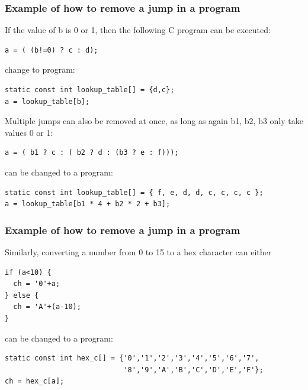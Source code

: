 \documentclass{beamer}
\begin{document}
\begin{frame}[fragile]
\frametitle{Example of how to remove a jump in a program}

If the value of b is 0 or 1, then the following C program can be executed:

\begin{verbatim}
a = ( (b!=0) ? c : d);
\end{verbatim}

change to program:

\begin{verbatim}
static const int lookup_table[] = {d,c};
a = lookup_table[b];
\end{verbatim}

\bigskip
Multiple jumps can also be removed at once, as long as again b1, b2, b3 only take values 0 or 1:

\begin{verbatim}
a = ( b1 ? c : ( b2 ? d : (b3 ? e : f)));
\end{verbatim}

can be changed to a program:

\begin{verbatim}
static const int lookup_table[] = { f, e, d, d, c, c, c, c };
a = lookup_table[b1 * 4 + b2 * 2 + b3];
\end{verbatim}
\end{frame}

\begin{frame}[fragile]
\frametitle{Example of how to remove a jump in a program}

Similarly, converting a number from 0 to 15 to a hex character can either
\begin{verbatim}
if (a<10) {
  ch = '0'+a;
} else {
  ch = 'A'+(a-10);
}
\end{verbatim}

can be changed to a program:

\begin{verbatim}
static const int hex_c[] = {'0','1','2','3','4','5','6','7',
                            '8','9','A','B','C','D','E','F'};
ch = hex_c[a];
\end{verbatim}
\end{frame}
\end{document}
